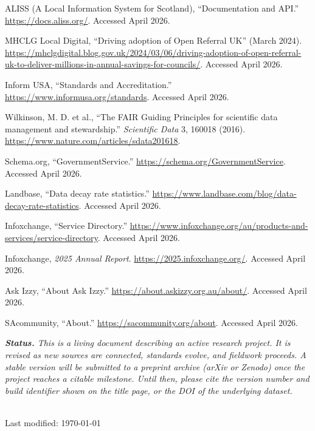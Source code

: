 \documentclass[11pt,a4paper]{article}
\begin{document}
\begin{enumerate}[nosep,label={[\arabic*]}]
    \item ALISS (A Local Information System for Scotland), ``Documentation and API.'' \url{https://docs.aliss.org/}. Accessed April 2026.
    \item MHCLG Local Digital, ``Driving adoption of Open Referral UK'' (March 2024). \url{https://mhclgdigital.blog.gov.uk/2024/03/06/driving-adoption-of-open-referral-uk-to-deliver-millions-in-annual-savings-for-councils/}. Accessed April 2026.
    \item Inform USA, ``Standards and Accreditation.'' \url{https://www.informusa.org/standards}. Accessed April 2026.
    \item Wilkinson, M. D. et al., ``The FAIR Guiding Principles for scientific data management and stewardship.'' \textit{Scientific Data} 3, 160018 (2016). \url{https://www.nature.com/articles/sdata201618}.
    \item Schema.org, ``GovernmentService.'' \url{https://schema.org/GovernmentService}. Accessed April 2026.
    \item Landbase, ``Data decay rate statistics.'' \url{https://www.landbase.com/blog/data-decay-rate-statistics}. Accessed April 2026.
    \item Infoxchange, ``Service Directory.'' \url{https://www.infoxchange.org/au/products-and-services/service-directory}. Accessed April 2026.
    \item Infoxchange, \textit{2025 Annual Report}. \url{https://2025.infoxchange.org/}. Accessed April 2026.
    \item Ask Izzy, ``About Ask Izzy.'' \url{https://about.askizzy.org.au/about/}. Accessed April 2026.
    \item SAcommunity, ``About.'' \url{https://sacommunity.org/about}. Accessed April 2026.
\end{enumerate}

\vfill
\begin{center}
\begin{minipage}{0.9\textwidth}
\small\itshape\color{gray}
\textbf{Status.} This is a living document describing an active research project. It is revised as new sources are connected, standards evolve, and fieldwork proceeds. A stable version will be submitted to a preprint archive (arXiv or Zenodo) once the project reaches a citable milestone. Until then, please cite the version number and build identifier shown on the title page, or the DOI of the underlying dataset.
\end{minipage}\\[1em]
{\small\color{gray} Last modified: \today}
\end{center}
\end{document}
